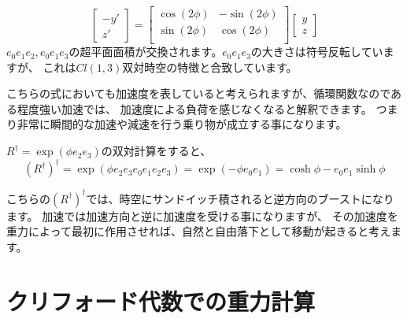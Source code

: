 \documentclass[a4paper,12pt,notitlepage]{jsreport}
\begin{document}
\begin{equation}
  \begin{bmatrix}
    -y'\\z'
  \end{bmatrix}
  =
  \begin{bmatrix}
    \cos(2\phi) & -\sin(2\phi) \\
    \sin(2\phi) & \cos(2\phi) \\
  \end{bmatrix}
  \begin{bmatrix}
    y\\z
  \end{bmatrix}
\end{equation}
$ e_0e_1e_2 , e_0e_1e_3 $の超平面面積が交換されます。$e_0e_1e_3$の大きさは符号反転していますが、
これは$ Cl(1,3) $双対時空の特徴と合致しています。

こちらの式においても加速度を表していると考えられますが、循環関数なのである程度強い加速では、
加速度による負荷を感じなくなると解釈できます。
つまり非常に瞬間的な加速や減速を行う乗り物が成立する事になります。

$R^\dag=\exp(\phi e_2e_3)$の双対計算をすると、
\begin{equation}
  (R^\dag)^\dag=\exp(\phi e_2e_3e_0e_1e_2e_3)=\exp(-\phi e_0e_1)=\cosh\phi-e_0e_1\sinh\phi
\end{equation}

こちらの$ (R^\dag)^\dag $では、時空にサンドイッチ積されると逆方向のブーストになります。
加速では加速方向と逆に加速度を受ける事になりますが、
その加速度を重力によって最初に作用させれば、自然と自由落下として移動が起きると考えます。

\section{クリフォード代数での重力計算}
\end{document}
